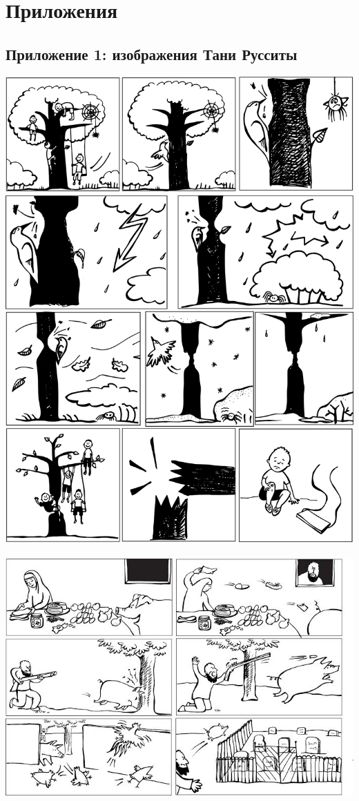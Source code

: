 \section{Приложения}
\subsection{Приложение 1: изображения Тани Русситы} \label{pictures}
\noindent \includegraphics[width=\linewidth]{pauk.jpg}\\
\pagebreak\\
\includegraphics[width=\linewidth]{svinja.jpg}\\
\pagebreak

